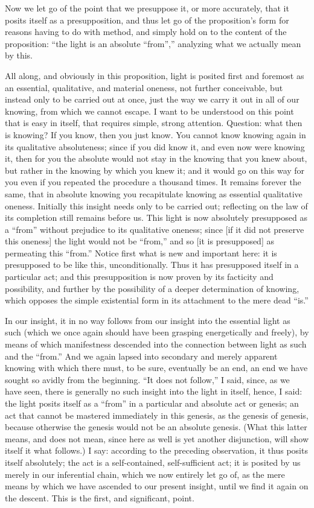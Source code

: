 Now we let go of the point that we presuppose it,
or more accurately, that it posits itself as a presupposition,
and thus let go of the proposition's form
for reasons having to do with method,
and simply hold on to the content of the proposition:
“the light is an absolute “from”,”
analyzing what we actually mean by this.

All along, and obviously in this proposition,
light is posited first and foremost as
an essential, qualitative, and material oneness,
not further conceivable, but instead only to be carried out at once,
just the way we carry it out in all of our knowing,
from which we cannot escape.
I want to be understood on this point that is easy in itself,
that requires simple, strong attention.
Question:
what then is knowing?
If you know, then you just know.
You cannot know knowing again
in its qualitative absoluteness;
since if you did know it,
and even now were knowing it,
then for you the absolute would not stay
in the knowing that you knew about,
but rather in the knowing by which you knew it;
and it would go on this way for you
even if you repeated the procedure a thousand times.
It remains forever the same, that in absolute knowing you
recapitulate knowing as essential qualitative oneness.
Initially this insight needs only to be carried out;
reflecting on the law of its completion still remains before us.
This light is now absolutely presupposed as a “from”
without prejudice to its qualitative oneness;
since [if it did not preserve this oneness] the light would
not be “from,” and so [it is presupposed] as permeating this “from.”
Notice first what is new and important here:
it is presupposed to be like this, unconditionally.
Thus it has presupposed itself in a particular act;
and this presupposition is now proven by its facticity and possibility,
and further by the possibility of a deeper determination of knowing,
which opposes the simple existential form
in its attachment to the mere dead “is.”

In our insight, it in no way follows from our insight
into the essential light as such
(which we once again should have been grasping
energetically and freely),
by means of which manifestness descended into the connection
between light as such and the “from.”
And we again lapsed into secondary and merely apparent knowing
with which there must, to be sure, eventually be an end,
an end we have sought so avidly from the beginning.
“It does not follow,”
I said, since, as we have seen, there is generally
no such insight into the light in itself,
hence, I said: the light posits itself
as a “from” in a particular and absolute act or genesis;
an act that cannot be mastered immediately in this genesis,
as the genesis of genesis,
because otherwise the genesis would
not be an absolute genesis.
(What this latter means, and does not mean,
since here as well is yet another disjunction,
will show itself it what follows.)
I say: according to the preceding observation,
it thus posits itself absolutely;
the act is a self-contained, self-sufficient act;
it is posited by us merely in our inferential chain,
which we now entirely let go of,
as the mere means by which we have
ascended to our present insight,
until we find it again on the descent.
This is the first, and significant, point.

